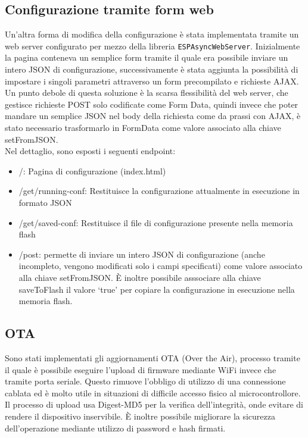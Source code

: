 \documentclass[12pt,a4paper]{report}
\begin{document}
\subsection{Configurazione tramite form web}
Un'altra forma di modifica della configurazione è stata implementata tramite un web server configurato per mezzo della libreria
\texttt{ESPAsyncWebServer}. Inizialmente la pagina conteneva un semplice form tramite il quale era possibile inviare un intero JSON
di configurazione, successivamente è stata aggiunta la possibilità di impostare i singoli parametri attraverso un form precompilato
e richieste AJAX. Un punto debole di questa soluzione è la scarsa flessibilità del web server, che gestisce richieste POST solo codificate
come Form Data, quindi invece che poter mandare un semplice JSON nel body della richiesta come da prassi con AJAX, è stato necessario
trasformarlo in FormData come valore associato alla chiave setFromJSON.\\
Nel dettaglio, sono esposti i seguenti endpoint:
\begin{itemize}
  \item /: Pagina di configurazione (index.html)
  \item /get/running-conf: Restituisce la configurazione attualmente in esecuzione in formato JSON
  \item /get/saved-conf: Restituisce il file di configurazione presente nella memoria flash
  \item /post: permette di inviare un intero JSON di configurazione (anche incompleto, vengono modificati solo i campi specificati) come
        valore associato alla chiave setFromJSON. È inoltre possibile asssociare alla chiave saveToFlash il valore `true' per copiare
        la configurazione in esecuzione nella memoria flash.
\end{itemize}

\subsection{OTA}
Sono stati implementati gli aggiornamenti OTA (Over the Air), processo tramite il quale è possibile eseguire l'upload di firmware
mediante WiFi invece che tramite porta seriale. Questo rimuove l'obbligo di utilizzo di una connessione cablata ed è molto utile
in situazioni di difficile accesso fisico al microcontrollore.\\
Il processo di upload usa Digest-MD5 per la verifica dell'integrità, onde evitare di rendere il dispositivo inservibile. È inoltre possibile
migliorare la sicurezza dell'operazione mediante utilizzo di password e hash firmati. \cite{espota}
\end{document}
